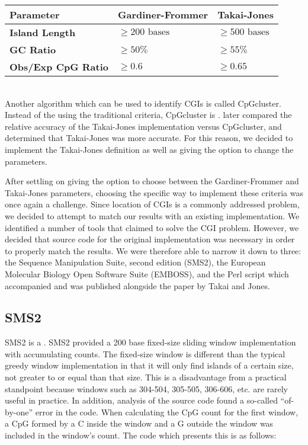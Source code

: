\documentclass{bioinfo}
\begin{document}
\begin{tabular}{ l | l | l}
  \hline
  \textbf{Parameter} & \textbf{Gardiner-Frommer} & \textbf{Takai-Jones} \\ \hline
  \textbf{Island Length} & $ \geq 200 \mbox{ bases} $ & $ \geq 500 \mbox{ bases} $ \\ \hline
  \textbf{GC Ratio} & $ \geq 50\% $ & $ \geq 55\% $ \\ \hline
  \textbf{Obs/Exp CpG Ratio} & $ \geq 0.6 $ & $ \geq 0.65 $ \\ \hline
\end{tabular} \\

Another algorithm which can be used to identify CGIs is called
CpGcluster. Instead of the using the traditional criteria, CpGcluster
is . \citep{pmid19232104}
later compared the relative accuracy of the Takai-Jones implementation
versus CpGcluster, and determined that Takai-Jones was more
accurate. For this reason, we decided to implement the Takai-Jones
definition as well as giving the option to change the parameters.

After settling on giving the option to choose between the
Gardiner-Frommer and Takai-Jones parameters, choosing the specific way
to implement these criteria was once again a challenge. Since location
of CGIs is a commonly addressed problem, we decided to attempt to
match our results with an existing implementation. We identified a
number of tools that claimed to solve the CGI problem. However, we
decided that source code for the original implementation was necessary
in order to properly match the results. We were therefore able to
narrow it down to three: the Sequence Manipulation Suite, second
edition (SMS2), the European Molecular Biology Open Software Suite
(EMBOSS), and the Perl script which accompanied and was published
alongside the paper by Takai and Jones.

\subsection{SMS2}

SMS2 is a . SMS2 provided a 200 base fixed-size sliding window
implementation with accumulating counts. The fixed-size window is
different than the typical greedy window implementation in that it
will only find islands of a certain size, not greater to or equal than
that size. This is a disadvantage from a practical standpoint because
windows such as 304-504, 305-505, 306-606, etc. are rarely useful in
practice. In addition, analysis of the source code found a so-called
``of-by-one'' error in the code. When calculating the CpG count for
the first window, a CpG formed by a C inside the window and a G
outside the window was included in the window's count. The code which
presents this is as follows:
\end{document}
